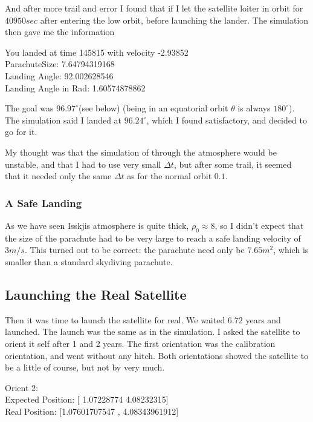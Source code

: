 \documentclass[a4paper, 10pt]{article}
\begin{document}
And after more trail and error I found that if I let the satellite loiter in orbit for $40950 sec$ after entering the low orbit, before launching the lander. The simulation then gave me the information

\begin{tcolorbox}
You landed at time 145815 with velocity -2.93852\\
ParachuteSize:  7.64794319168\\
Landing Angle:  92.002628546\\
Landing Angle in Rad:  1.60574878862
\end{tcolorbox}

The goal was $96.97^\circ$(see below) (being in an equatorial orbit $\theta$ is always $180^\circ$). The simulation said I landed at $96.24^\circ$, which I found satisfactory, and decided to go for it.

My thought was that the simulation of through the atmosphere would be unstable, and that I had to use very small $\Delta t$, but after some trail, it seemed that it needed only the same $\Delta t$ as for the normal orbit $0.1$.

\subsubsection{A Safe Landing}
As we have seen Isskjis atmosphere is quite thick, $\rho_0 \approx 8$, so I didn't expect that the size of the parachute had to be very large to reach a safe landing velocity of $3m/s$. This turned out to be correct: the parachute need only be  $7.65 m^2$, which is smaller than a standard skydiving parachute.


\subsection{Launching the Real Satellite} 
Then it was time to launch the satellite for real. We waited $6.72$ years and launched. The launch was the same as in the simulation. I asked the satellite to orient it self after 1 and 2 years. The first orientation was the calibration orientation, and went without any hitch. Both orientations showed the satellite to be a little of course, but not by very much. 

\begin{tcolorbox}
Orient 2:\\
Expected Position: [ 1.07228774  4.08232315]\\
Real Position: [1.07601707547 , 4.08343961912]
\end{tcolorbox}
\end{document}
